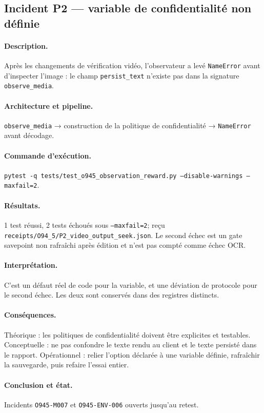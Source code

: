 \documentclass[11pt,a4paper]{article}
\begin{document}
\subsection{Incident P2 — variable de confidentialité non définie}
\paragraph{Description.} Après les changements de vérification vidéo, l'observateur a levé \texttt{NameError} avant d'inspecter l'image : le champ \texttt{persist\_text} n'existe pas dans la signature \texttt{observe\_media}.
\paragraph{Architecture et pipeline.} \texttt{observe\_media} → construction de la politique de confidentialité → \texttt{NameError} avant décodage.
\paragraph{Commande d'exécution.} \texttt{pytest -q tests/test\_o945\_observation\_reward.py --disable-warnings --maxfail=2}.
\paragraph{Résultats.} 1 test réussi, 2 tests échoués sous \texttt{--maxfail=2}; reçu \texttt{receipts/O94\_5/P2\_video\_output\_seek.json}. Le second échec est un gate savepoint non rafraîchi après édition et n'est pas compté comme échec OCR.
\paragraph{Interprétation.} C'est un défaut réel de code pour la variable, et une déviation de protocole pour le second échec. Les deux sont conservés dans des registres distincts.
\paragraph{Conséquences.} Théorique : les politiques de confidentialité doivent être explicites et testables. Conceptuelle : ne pas confondre le texte rendu au client et le texte persisté dans le rapport. Opérationnel : relier l'option déclarée à une variable définie, rafraîchir la sauvegarde, puis refaire l'essai entier.
\paragraph{Conclusion et état.} Incidents \texttt{O945-M007} et \texttt{O945-ENV-006} ouverts jusqu'au retest.
\end{document}
